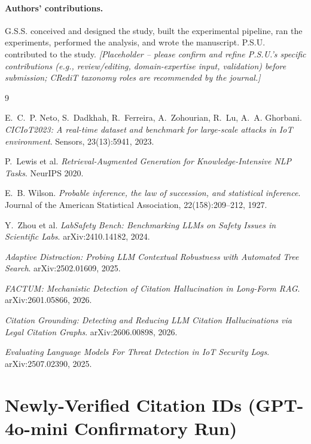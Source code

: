 \documentclass[10pt,twocolumn]{article}
\begin{document}
\paragraph{Authors' contributions.} G.S.S. conceived and designed the study, built the
experimental pipeline, ran the experiments, performed the analysis, and wrote the manuscript.
P.S.U. contributed to the study. \emph{[Placeholder -- please confirm and refine P.S.U.'s specific
contributions (e.g., review/editing, domain-expertise input, validation) before submission; CRediT
taxonomy roles are recommended by the journal.]}

\begin{thebibliography}{9}

E.~C.~P. Neto, S.~Dadkhah, R.~Ferreira, A.~Zohourian, R.~Lu, A.~A. Ghorbani.
\textit{CICIoT2023: A real-time dataset and benchmark for large-scale attacks in IoT
environment}. Sensors, 23(13):5941, 2023.

P.~Lewis et al.
\textit{Retrieval-Augmented Generation for Knowledge-Intensive NLP Tasks}.
NeurIPS 2020.

E.~B. Wilson.
\textit{Probable inference, the law of succession, and statistical inference}.
Journal of the American Statistical Association, 22(158):209--212, 1927.

Y.~Zhou et al.
\textit{LabSafety Bench: Benchmarking LLMs on Safety Issues in Scientific Labs}.
arXiv:2410.14182, 2024.

\textit{Adaptive Distraction: Probing LLM Contextual Robustness with Automated Tree Search}.
arXiv:2502.01609, 2025.

\textit{FACTUM: Mechanistic Detection of Citation Hallucination in Long-Form RAG}.
arXiv:2601.05866, 2026.

\textit{Citation Grounding: Detecting and Reducing LLM Citation Hallucinations via Legal
Citation Graphs}. arXiv:2606.00898, 2026.

\textit{Evaluating Language Models For Threat Detection in IoT Security Logs}.
arXiv:2507.02390, 2025.

\end{thebibliography}

\appendix
\section{Newly-Verified Citation IDs (GPT-4o-mini Confirmatory Run)}
\label{sec:appendix}
\end{document}
